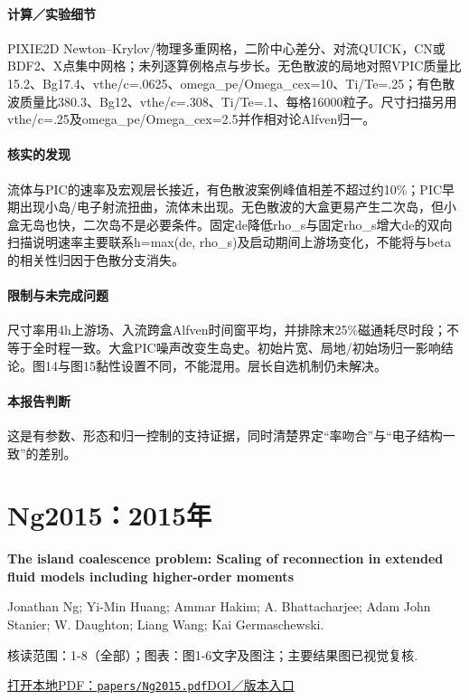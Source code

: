 \documentclass[UTF8,a4paper,11pt,openany,fontset=fandol]{ctexbook}
\begin{document}
\paragraph{计算／实验细节}PIXIE2D Newton–Krylov/物理多重网格，二阶中心差分、对流QUICK，CN或BDF2、X点集中网格；未列逐算例格点与步长。无色散波的局地对照VPIC质量比15.2、Bg17.4、vthe/c=.0625、omega\_pe/Omega\_cex=10、Ti/Te=.25；有色散波质量比380.3、Bg12、vthe/c=.308、Ti/Te=.1、每格16000粒子。尺寸扫描另用vthe/c=.25及omega\_pe/Omega\_cex=2.5并作相对论Alfven归一。

\paragraph{核实的发现}流体与PIC的速率及宏观层长接近，有色散波案例峰值相差不超过约10\%；PIC早期出现小岛/电子射流扭曲，流体未出现。无色散波的大盒更易产生二次岛，但小盒无岛也快，二次岛不是必要条件。固定de降低rho\_s与固定rho\_s增大de的双向扫描说明速率主要联系h=max(de, rho\_s)及启动期间上游场变化，不能将与beta的相关性归因于色散分支消失。

\paragraph{限制与未完成问题}尺寸率用4h上游场、入流跨盒Alfven时间窗平均，并排除末25\%磁通耗尽时段；不等于全时程一致。大盒PIC噪声改变生岛史。初始片宽、局地/初始场归一影响结论。图14与图15黏性设置不同，不能混用。层长自选机制仍未解决。

\paragraph{本报告判断}这是有参数、形态和归一控制的支持证据，同时清楚界定“率吻合”与“电子结构一致”的差别。

\section{Ng2015：2015年}\label{paper:Ng2015}

\textbf{The island coalescence problem: Scaling of reconnection in extended fluid models including higher-order moments}\citep{Ng2015}\

Jonathan Ng;  Yi-Min Huang;  Ammar Hakim;  A. Bhattacharjee;  Adam  John Stanier;  W. Daughton;  Liang Wang;  Kai Germaschewski.

\textsf{核读范围：}1-8（全部）；\textsf{图表：}图1-6文字及图注；主要结果图已视觉复核.

\href{run:../papers/Ng2015.pdf}{打开本地PDF：\texttt{papers/Ng2015.pdf}}\quad\href{https://doi.org/10.1063/1.4935302}{DOI／版本入口}
\end{document}
